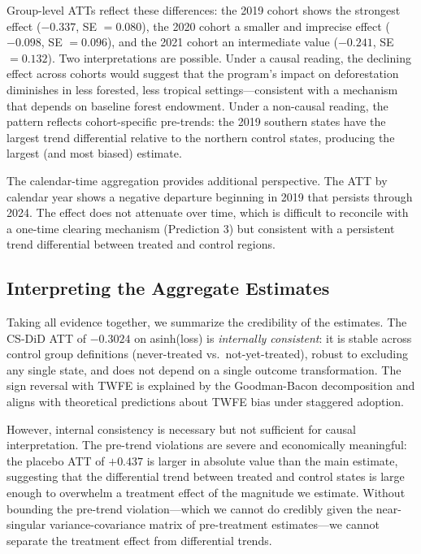 \documentclass[12pt]{article}
\begin{document}
Group-level ATTs reflect these differences: the 2019 cohort shows the strongest effect ($-0.337$, SE $= 0.080$), the 2020 cohort a smaller and imprecise effect ($-0.098$, SE $= 0.096$), and the 2021 cohort an intermediate value ($-0.241$, SE $= 0.132$). Two interpretations are possible. Under a causal reading, the declining effect across cohorts would suggest that the program's impact on deforestation diminishes in less forested, less tropical settings---consistent with a mechanism that depends on baseline forest endowment. Under a non-causal reading, the pattern reflects cohort-specific pre-trends: the 2019 southern states have the largest trend differential relative to the northern control states, producing the largest (and most biased) estimate.

The calendar-time aggregation provides additional perspective. The ATT by calendar year shows a negative departure beginning in 2019 that persists through 2024. The effect does not attenuate over time, which is difficult to reconcile with a one-time clearing mechanism (Prediction 3) but consistent with a persistent trend differential between treated and control regions.

\subsection{Interpreting the Aggregate Estimates}

Taking all evidence together, we summarize the credibility of the estimates. The CS-DiD ATT of $-0.3024$ on asinh(loss) is \textit{internally consistent}: it is stable across control group definitions (never-treated vs.\ not-yet-treated), robust to excluding any single state, and does not depend on a single outcome transformation. The sign reversal with TWFE is explained by the Goodman-Bacon decomposition and aligns with theoretical predictions about TWFE bias under staggered adoption.

However, internal consistency is necessary but not sufficient for causal interpretation. The pre-trend violations are severe and economically meaningful: the placebo ATT of $+0.437$ is larger in absolute value than the main estimate, suggesting that the differential trend between treated and control states is large enough to overwhelm a treatment effect of the magnitude we estimate. Without bounding the pre-trend violation---which we cannot do credibly given the near-singular variance-covariance matrix of pre-treatment estimates---we cannot separate the treatment effect from differential trends.
\end{document}
